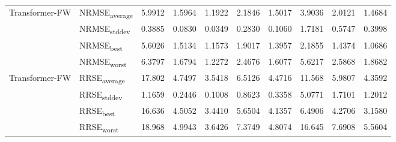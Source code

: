 {\begin{longtable}{l l c c c c c c c c}
\cmidrule(lr){2-10}
\multirow{4}{*}{Transformer-FW} & NRMSE\textsubscript{average} & 5.9912 & 1.5964 & 1.1922 & 2.1846 & 1.5017 & 3.9036 & 2.0121 & 1.4684 \\
 & NRMSE\textsubscript{stddev} & 0.3885 & 0.0830 & 0.0349 & 0.2830 & 0.1060 & 1.7181 & 0.5747 & 0.3998 \\
 & NRMSE\textsubscript{best} & 5.6026 & 1.5134 & 1.1573 & 1.9017 & 1.3957 & 2.1855 & 1.4374 & 1.0686 \\
 & NRMSE\textsubscript{worst} & 6.3797 & 1.6794 & 1.2272 & 2.4676 & 1.6077 & 5.6217 & 2.5868 & 1.8682 \\
\cmidrule(lr){2-10}
\multirow{4}{*}{Transformer-FW} & RRSE\textsubscript{average} & 17.802 & 4.7497 & 3.5418 & 6.5126 & 4.4716 & 11.568 & 5.9807 & 4.3592 \\
 & RRSE\textsubscript{stddev} & 1.1659 & 0.2446 & 0.1008 & 0.8623 & 0.3358 & 5.0771 & 1.7101 & 1.2012 \\
 & RRSE\textsubscript{best} & 16.636 & 4.5052 & 3.4410 & 5.6504 & 4.1357 & 6.4906 & 4.2706 & 3.1580 \\
 & RRSE\textsubscript{worst} & 18.968 & 4.9943 & 3.6426 & 7.3749 & 4.8074 & 16.645 & 7.6908 & 5.5604 \\
\cmidrule(lr){2-10}
\end{longtable}
}